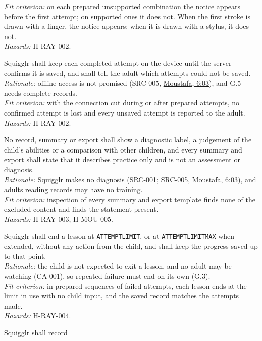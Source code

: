 \documentclass[12pt]{article}
\renewcommand{\_}{\textunderscore\allowbreak}%
\newcommand{\intlink}[3]{\hyperref[int:#1-#2]{#3}}
\newcommand{\intref}[2]{\intlink{#1}{#2}{#1, #2}}
\begin{document}
\begin{description}
\emph{Fit criterion:} on each prepared unsupported combination the notice
appears before the first attempt; on supported ones it does not. When the
first stroke is drawn with a finger, the notice appears; when it is drawn with
a stylus, it does not.\\
\emph{Hazards:} H-RAY-002.
\item[SAF-RAY-003]\label{req:SAF-RAY-003} Squigglr shall keep
each completed attempt on the device until the server confirms it is saved, and
shall tell the adult which attempts could not be saved.\\
\emph{Rationale:} offline access is not promised (SRC-005,
\intref{Moustafa}{6:03}), and G.5 needs complete records.\\
\emph{Fit criterion:} with the connection cut during or after prepared attempts,
no confirmed attempt is lost and every unsaved attempt is reported to the
adult.\\
\emph{Hazards:} H-RAY-002.
\item[SAF-RAY-004]\label{req:SAF-RAY-004} No record, summary or
export shall show a diagnostic label, a judgement of the child's abilities or a
comparison with other children, and every summary and export shall state that it
describes practice only and is not an assessment or diagnosis.\\
\emph{Rationale:} Squigglr makes no diagnosis (SRC-001; SRC-005,
\intref{Moustafa}{6:03}), and adults reading records may have no training.\\
\emph{Fit criterion:} inspection of every summary and export template finds none
of the excluded content and finds the statement present.\\
\emph{Hazards:} H-RAY-003, H-MOU-005.
\item[SAF-RAY-005]\label{req:SAF-RAY-005} Squigglr shall end a
lesson at \texttt{ATTEMPT\_LIMIT}, or at \texttt{ATTEMPT\_LIMIT\_MAX} when
extended, without any action from the child, and shall keep the progress saved
up to that point.\\
\emph{Rationale:} the child is not expected to exit a lesson, and no adult may
be watching (CA-001), so repeated failure must end on its own (G.3).\\
\emph{Fit criterion:} in prepared sequences of failed attempts, each lesson ends
at the limit in use with no child input, and the saved record matches the
attempts made.\\
\emph{Hazards:} H-RAY-004.
\item[SAF-RAY-006]\label{req:SAF-RAY-006} Squigglr shall record

\end{description}
\end{document}
